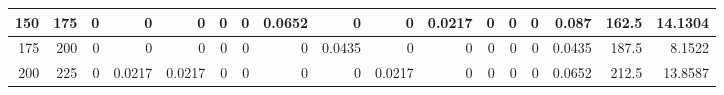 \begin{table}[ht]
\begin{adjustbox}{width = \textwidth, center}
\begin{tabular}{|rr|r|r|r|r|r|r|r|r|r|r|r|r|r|r|r|}
            \rowcolor[HTML]{FFFFFF} 
            \cellcolor[HTML]{D9EAD3}150            & \cellcolor[HTML]{C8E4BE}175            & 0                                              & 0                                              & 0                                              & 0                                              & 0                                              & \cellcolor[HTML]{57BB8A}0.0652                 & 0                                              & 0                                               & \cellcolor[HTML]{C7E9D8}0.0217                  & 0                                               & 0                                               & 0                                               & \cellcolor[HTML]{D9D2E9}0.087                                                   & \cellcolor[HTML]{D9D2E9}162.5                                           & \cellcolor[HTML]{D9D2E9}14.1304                                                       \\ \hline
            \rowcolor[HTML]{FFFFFF} 
            \cellcolor[HTML]{D9EAD3}175            & \cellcolor[HTML]{C8E4BE}200            & 0                                              & 0                                              & 0                                              & 0                                              & 0                                              & 0                                              & \cellcolor[HTML]{8FD2B1}0.0435                 & 0                                               & 0                                               & 0                                               & 0                                               & 0                                               & \cellcolor[HTML]{D9D2E9}0.0435                                                  & \cellcolor[HTML]{D9D2E9}187.5                                           & \cellcolor[HTML]{D9D2E9}8.1522                                                        \\ \hline
            \rowcolor[HTML]{FFFFFF} 
            \cellcolor[HTML]{D9EAD3}200            & \cellcolor[HTML]{C8E4BE}225            & 0                                              & \cellcolor[HTML]{C7E9D8}0.0217                 & \cellcolor[HTML]{C7E9D8}0.0217                 & 0                                              & 0                                              & 0                                              & 0                                              & \cellcolor[HTML]{C7E9D8}0.0217                  & 0                                               & 0                                               & 0                                               & 0                                               & \cellcolor[HTML]{D9D2E9}0.0652                                                  & \cellcolor[HTML]{D9D2E9}212.5                                           & \cellcolor[HTML]{D9D2E9}13.8587                                                       \\ \hline

\end{tabular}
\end{adjustbox}
\end{table}
